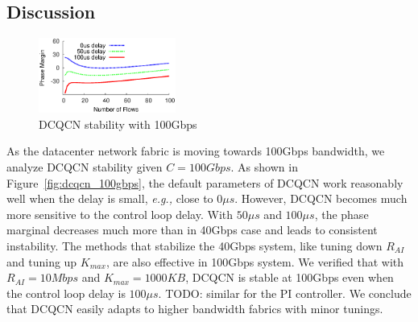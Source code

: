 \subsection{Discussion}

\begin{figure}[t]
\center
\includegraphics[width=0.4\textwidth]{figures/dcqcn_stability_100gbps.eps}
\caption{DCQCN stability with 100Gbps}
\end{figure}


  As the datacenter network fabric is moving towards 100Gbps bandwidth, we analyze
DCQCN stability given $C=100Gbps$. As shown in Figure~\ref{fig:dcqcn_100gbps}, the default parameters of DCQCN work 
reasonably well when the delay is small, {\em e.g.,} close to $0\mu s$.
However, DCQCN becomes much more sensitive to the control loop delay. With $50\mu s$ and $100\mu s$, the phase marginal
decreases much more than in 40Gbps case and leads to consistent instability.
The methods that stabilize the 40Gbps system, like tuning down $R_{AI}$ and tuning up $K_{max}$, are also effective
in 100Gbps system. We verified that with $R_{AI}=10Mbps$ and $K_{max}=1000KB$, DCQCN is stable at 100Gbps even when
the control loop delay is $100\mu s$. TODO: similar for the PI controller. We conclude that DCQCN easily adapts to 
higher bandwidth fabrics with minor tunings. 

